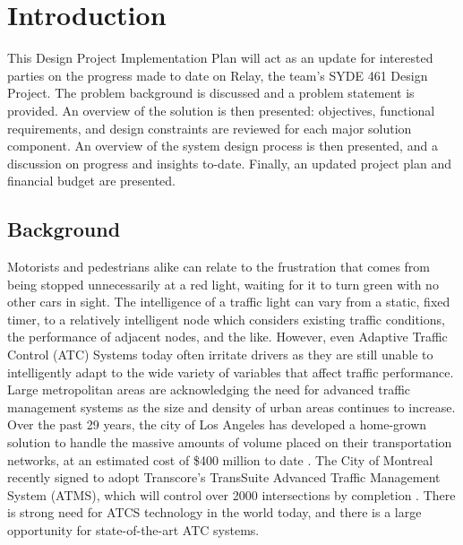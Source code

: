 \documentclass{report}
\begin{document}
\newpage
\doublespacing
{}

\chapter{Introduction}
\setlength{\parindent}{1cm}
This Design Project Implementation Plan will act as an update for interested parties on the progress made to date on Relay, the team's SYDE 461 Design Project. The problem background is discussed and a problem statement is provided. An overview of the solution is then presented: objectives, functional requirements, and design constraints are reviewed for each major solution component. An overview of the system design process is then presented, and a discussion on progress and insights to-date. Finally, an updated project plan and financial budget are presented.\\


\section{Background}
Motorists and pedestrians alike can relate to the frustration that comes from being stopped unnecessarily at a red light, waiting for it to turn green with no other cars in sight.
The intelligence of a traffic light can vary from a static, fixed timer, to a relatively intelligent node which considers existing traffic conditions, the performance of adjacent nodes, and the like.
However, even Adaptive Traffic Control (ATC) Systems today often irritate drivers as they are still unable to intelligently adapt to the wide variety of variables that affect traffic performance.\\

Large metropolitan areas are acknowledging the need for advanced traffic management systems as the size and density of urban areas continues to increase.
Over the past 29 years, the city of Los Angeles has developed a home-grown solution to handle the massive amounts of volume placed on their transportation networks, at an estimated cost of \$400 million to date \cite{la-atcs-article}.
The City of Montreal recently signed to adopt Transcore's TransSuite Advanced Traffic Management System (ATMS), which will control over 2000 intersections by completion \cite{montreal-transcore}.
There is strong need for ATCS technology in the world today, and there is a large opportunity for state-of-the-art ATC systems.\\
\end{document}
